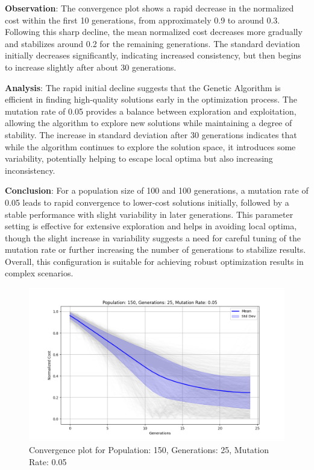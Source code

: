 \documentclass{article}
\begin{document}
    \textbf{Observation}: The convergence plot shows a rapid decrease in the normalized cost within the first 10 generations, from approximately 0.9 to around 0.3. Following this sharp decline, the mean normalized cost decreases more gradually and stabilizes around 0.2 for the remaining generations. The standard deviation initially decreases significantly, indicating increased consistency, but then begins to increase slightly after about 30 generations.

    \textbf{Analysis}: The rapid initial decline suggests that the Genetic Algorithm is efficient in finding high-quality solutions early in the optimization process. The mutation rate of 0.05 provides a balance between exploration and exploitation, allowing the algorithm to explore new solutions while maintaining a degree of stability. The increase in standard deviation after 30 generations indicates that while the algorithm continues to explore the solution space, it introduces some variability, potentially helping to escape local optima but also increasing inconsistency.

    \textbf{Conclusion}: For a population size of 100 and 100 generations, a mutation rate of 0.05 leads to rapid convergence to lower-cost solutions initially, followed by a stable performance with slight variability in later generations. This parameter setting is effective for extensive exploration and helps in avoiding local optima, though the slight increase in variability suggests a need for careful tuning of the mutation rate or further increasing the number of generations to stabilize results. Overall, this configuration is suitable for achieving robust optimization results in complex scenarios.

    \begin{figure}[H]
        \centering
        \includegraphics[width=\textwidth]{genetic_algorithm/Population_150_Generations_25_MutationRate_0.05}
        \caption{Convergence plot for Population: 150, Generations: 25, Mutation Rate: 0.05}
        \label{fig:ga_150_25_05}
    \end{figure}
\end{document}

